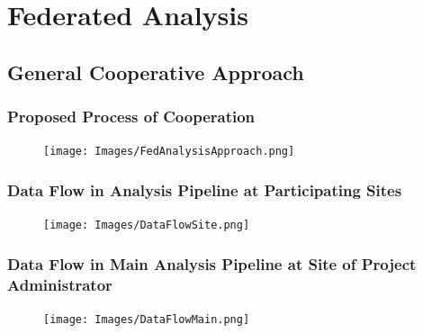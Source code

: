 \documentclass[
  letterpaper,
  DIV=11,
  numbers=noendperiod]{scrreprt}
\begin{document}
\part{Federated Analysis}

\hypertarget{general-cooperative-approach}{%
\chapter{General Cooperative
Approach}\label{general-cooperative-approach}}

\hfill\break

\hypertarget{proposed-process-of-cooperation}{%
\section{Proposed Process of
Cooperation}\label{proposed-process-of-cooperation}}

\begin{figure}

{\centering \texttt{[image: Images/FedAnalysisApproach.png]}

}

\end{figure}

\hypertarget{data-flow-in-analysis-pipeline-at-participating-sites}{%
\section{Data Flow in Analysis Pipeline at Participating
Sites}\label{data-flow-in-analysis-pipeline-at-participating-sites}}

\begin{figure}

{\centering \texttt{[image: Images/DataFlowSite.png]}

}

\end{figure}

\hypertarget{data-flow-in-main-analysis-pipeline-at-site-of-project-administrator}{%
\section{Data Flow in Main Analysis Pipeline at Site of Project
Administrator}\label{data-flow-in-main-analysis-pipeline-at-site-of-project-administrator}}

\begin{figure}

{\centering \texttt{[image: Images/DataFlowMain.png]}

}

\end{figure}
\end{document}
